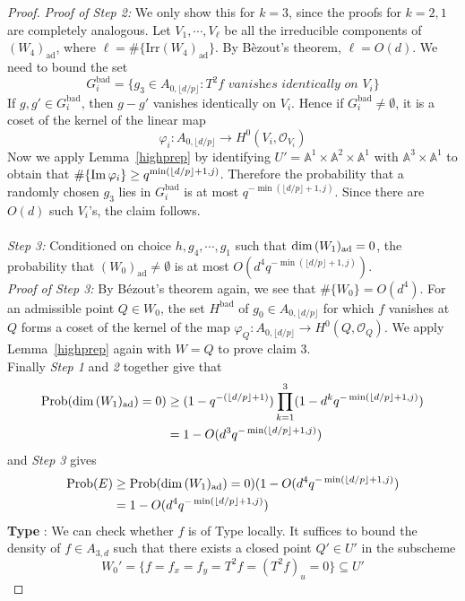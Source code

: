 \documentclass[12pt]{article}
\theoremstyle{plain}
\theoremstyle{definition}
\newcommand{\IA}{\mathbb{A}}
\newcommand{\sO}{\mathcal{O}}
\renewcommand\dim{{\rm dim\,}}
\newcommand{\im}{{\rm Im\,}}
\newcommand{\<}{\langle}
\renewcommand{\>}{\rangle}
\newcommand{\Prob}{\mathrm{Prob}}
\newcommand{\ad}{\mathrm{ad}}
\newcommand{\yk}{\lfloor d/p \rfloor}
\newcommand{\Irr}{\mathrm{Irr}}
\begin{document}
\begin{proof}
\textit{Proof of Step 2: }We only show this for $k = 3$, since the proofs for $k = 2, 1$ are completely analogous. Let $V_1, \cdots, V_\ell$ be all the irreducible components of $(W_4)_\ad$, where $\ell = \# \{\Irr (W_4)_\ad \}$. By B{\`e}zout's theorem, $\ell = O(d)$. We need to bound the set 
$$ G_i^{\mathrm{bad}} = \{ g_3 \in A_{0, \yk} : T^2 f \textit{ vanishes identically on }V_i \} $$ 
If $g, g' \in G_i^{\mathrm{bad}}$, then $g - g'$ vanishes identically on $V_i$. Hence if $G_i^{\mathrm{bad}} \neq \emptyset$, it is a coset of the kernel of the linear map 
$$ \varphi_i : A_{0, \yk} \to H^0(V_i, \sO_{V_i}) $$ 
Now we apply Lemma~\ref{highprep} by identifying $U' = \IA^1 \times \IA^2 \times \IA^1$ with $\IA^3 \times \IA^1$ to obtain that $\# \{ \im \varphi_i \} \ge q^{\min(\yk + 1, j)}$. Therefore the probability that a randomly chosen $g_3$ lies in $G_i^{\mathrm{bad}}$ is at most  $q^{- \min(\yk + 1, j)}$. Since there are $O(d)$ such $V_i$'s, the claim follows. \\\\
\textit{Step 3: }Conditioned on choice $h, g_4, \cdots, g_1$ such that $\dim (W_1)_\ad = 0$, the probability that $(W_0)_\ad \neq \emptyset$ is at most $O(d^4 q^{- \min(\yk + 1, j)})$. \\
\textit{Proof of Step 3:} By B{\'e}zout's theorem again, we see that $\# \{ W_0 \} = O(d^4)$. For an admissible point $Q \in W_0$, the set $H^{\mathrm{bad}}$ of $g_0 \in A_{0, \yk}$ for which $f$ vanishes at $Q$ forms a coset of the kernel of the map $\varphi_Q : A_{0, \yk} \to H^0(Q, \sO_Q)$. We apply Lemma~\ref{highprep} again with $W = Q$ to prove claim 3. \\
Finally \textit{Step 1} and \textit{2} together give that 
\begin{align*}
\Prob(\dim (W_1)_\ad) = 0) &\ge (1 - q^{-(\yk + 1)})\prod_{k = 1}^3 (1 - d^k q^{- \min(\yk + 1, j)}) \\
&= 1 - O(d^3 q^{- \min(\yk + 1, j)})
\end{align*}
and \textit{Step 3} gives 
\begin{align*}
\Prob(E) &\ge \Prob(\dim (W_1)_\ad) = 0)( 1 - O(d^4 q^{- \min(\yk + 1, j)}) \\ 
&= 1 - O(d^4 q^{- \min(\yk + 1, j)})
\end{align*}
\textbf{Type \uppercase\expandafter{}}: We can check whether $f$ is of Type \uppercase\expandafter{} locally. It suffices to bound the density of $f \in A_{3, d}$ such that there exists a closed point $Q' \in U'$ in the subscheme 
$$ W_0' = \{ f = f_x = f_y = T^2 f = (T^2 f)_u = 0 \} \subseteq U' $$

\end{proof}
\end{document}
